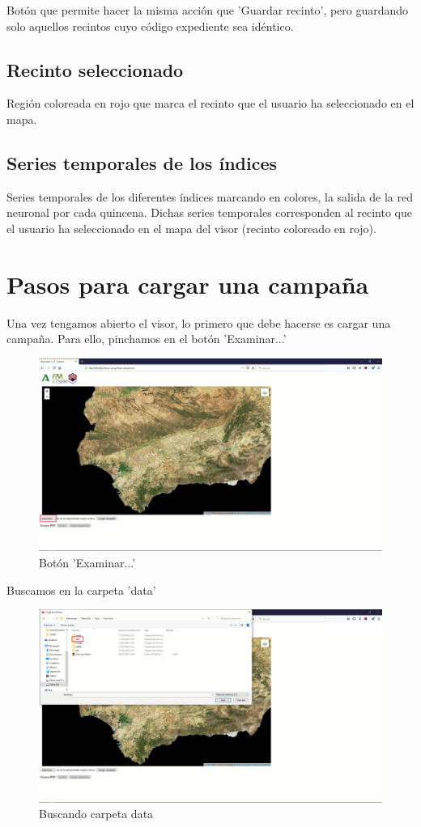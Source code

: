 \documentclass{article}
\begin{document}
Botón que permite hacer la misma acción que 'Guardar recinto', pero guardando solo aquellos recintos cuyo código expediente sea idéntico.

\subsection{Recinto seleccionado}

Región coloreada en rojo que marca el recinto que el usuario ha seleccionado en el mapa.

\subsection{Series temporales de los índices}

Series temporales de los diferentes índices marcando en colores, la salida de la red neuronal por cada quincena. Dichas series temporales corresponden al recinto que el usuario ha seleccionado en el mapa del visor (recinto coloreado en rojo).

\section{Pasos para cargar una campaña}

Una vez tengamos abierto el visor, lo primero que debe hacerse es cargar una campaña. Para ello, pinchamos en el botón 'Examinar...'

\begin{figure}[H]
	\centering
	\includegraphics[width=0.8\linewidth]{examinar.jpg}
	\caption{Botón 'Examinar...'}
	\label{fig:examinar}
\end{figure}

Buscamos en la carpeta 'data'

\begin{figure}[H]
	\centering
	\includegraphics[width=0.8\linewidth]{data.jpg}
	\caption{Buscando carpeta data}
	\label{fig:data}
\end{figure}
\end{document}
